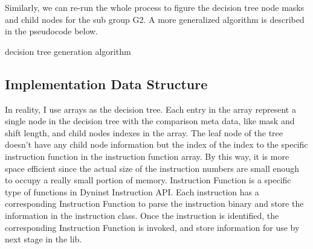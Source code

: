\documentclass[]{article}
\begin{document}
Similarly, we can re-run the whole process to figure the decision tree node masks and child nodes for the sub group G2. A more generalized algorithm is described in the pseudocode below.

\begin{algorithm}[h]
\caption{decision tree generation algorithm}\label{euclid}
\begin{algorithmic}[1]

		\State \Return 
	\EndIf
	\newline
	
	\EndFor
	\newline
	
	
	\EndFor
	\newline
	
	
	\EndFor
	
	\EndProcedure
\end{algorithmic}	
	
\end{algorithm}


\subsection{Implementation Data Structure}
In reality, I use arrays as the decision tree. Each entry in the array represent a single node in the decision tree with the comparison meta data, like mask and shift length, and child nodes indexes in the array. The leaf node of the tree doesn't have any child node information but the index of the index to the specific instruction function in the instruction function array. By this way, it is more space efficient since the actual size of the instruction numbers are small enough to occupy a really small portion of memory\cite{WEBSITE:BSTArray}. Instruction Function is a specific type of functions in Dyninst Instruction API. Each instruction has a corresponding Instruction Function to parse the instruction
binary and store the information in the instruction class. Once the instruction is identified, the corresponding Instruction Function is
invoked, and store information for use by next stage in the lib.
\end{document}
